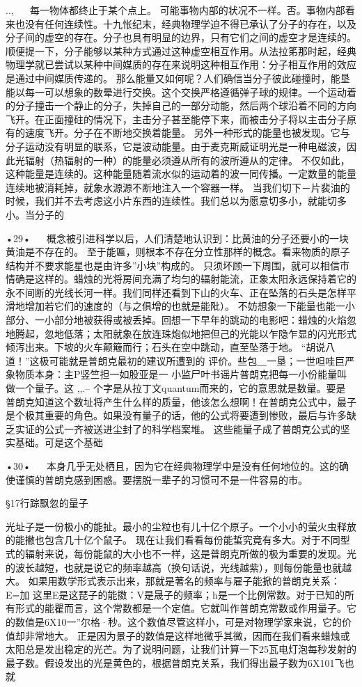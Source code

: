 ..,
  
每一物体都终止于某个点上。
可能事物内部的状况不一样。否。事物内部看来也没有任何连续性。十九怅纪末，经典物理学迫不得已承认了分子的存在，以及分子间的虚空的存在。分子也具有明显的边界，只有它们之间的虚空才是连续的。
顺便提一下，分子能够以某种方式通过这种虚空相互作用。从法拉笫那时起，经典物理学就已尝试以某种中间媒质的存在来说明这种相互作用：分子相互作用的效应是通过中间媒质传递的。
那么能量又如何呢？人们确信当分子彼此碰撞时，能垦能以每一可以想象的数晕进行交换。这个交换严格遵循弹子球的规律。一个运动着的分子撞击一个静止的分子，失掉自己的一部分动能，然后两个球沿着不同的方向飞开。在正面撞砫的情况下，主击分子甚至能停下来，而被击分子将以主击分子原有的速度飞开。分子在不断地交换着能量。
另外一种形式的能量也被发现。它与分子运动没有明显的联系，它是波动能量。由于麦克斯威证明光是一种电磁波，因此光辐射（热辐射的一种）的能量必须遵从所有的波所遵从的定律。
不仅如此，这种能量是连续的。这种能量随着流水似的运动着的波一同传播。一定数量的能量连续地被消耗掉，就象水源源不断地注入一个容器一样。
当我们切下－片裴油的时候，我们并不去考虑这小片东西的连续性。我们总以为愿意切多小，就能切多小。当分子的

•29•
  
概念被引进科学以后，人们清楚地认识到：比黄油的分子还要小的一块黄油是不存在的。
至于能匾，则根本不存在分立性那样的概念。看来物质的原子结构并不要求能星也是由许多”小块”构成的。
只须坏顾一下周围，就可以相信市情确是这样的。蜡烛的光将房间充满了均匀的辐射能流，正象太阳永远保持着它的永不间断的光线长河一样。我们同样还看到下山的火车、正在坠落的石头是怎样平滑地增加若它们的速度的（与之俱增的也就是能阰）。
不妨想象一下能量也能一小部分、一小部分地被获得或被丢掉。回想一下早年的跳动的电影吧：蜡烛的火焰忽地腾起，忽地低落；太阳就象在放连珠炮似地把但己的光能以乍隐乍显的闪光形式倾泻出来。下坡的火车颠簸而行；石头在空中跳动，直至坠落于地。
“胡说八道！”这极可能就是普朗克最初的建议所遭到的
评价。些包＿一垦；一世呾哇巨严象物质本身：主P竖竺担一如股亚是一
小监尸叶书谣片普朗克把每一小份能量叫做一个量子。这
,,.--
个字是从拉丁文quantum而来的，它的意思就是数量。要是
普朗克知道这个数址将产生什么样的质量，他该怎么想啊！在普朗克公式中，最子是个极其重要的角色。如果没有量子的话，他的公式将要遭到惨败，最后与许多缺乏实证的公式一齐被送进尘封了的科学档案堆。
这些能量子成了普朗克公式的坚实基础。可是这个基础

•30•
  
本身几乎无处栖且，因为它在经典物理学中是没有任何地位的。这的确使谨慎的普朗克感到困惑。要摆脱一辈子的习惯可不是一件容易的市。

§17行踪飘忽的量子

光址子是一份极小的能扯。最小的尘粒也有儿十亿个原子。一个小小的萤火虫释放的能撇也包含几十亿个鼠子。
现在让我们看看每份能蜇究竟有多大。对于不同型式的辐射来说，每份能鼠的大小也不一样，这是普朗克所做的极为重要的发现。光的波长越短，也就是说它的频率越高（换句话说，光线越紫），则每份能量也就越大。
如果用数学形式表示出来，那就是著名的频率与雇子能掀的普朗克关系：
E=加
这里E是这琵子的能擞：V是晟子的频率；h是一个比例常数。对于已知的所有形式的能瞿而言，这个常数都是一个定值。它就叫作普朗克常数或作用量子。它的数值是6X10一”尔格·秒。这个数值尽管这样小，可是对物理学家来说，它的价值却非常地大。
正是因为景子的数值是这样地微乎其微，因而在我们看来蜡烛或太阳总是发出稳定的光芒。为了说明问题，让我们计算一下25瓦电灯泡每秒发射的最子数。假设发出的光是黄色的，根据普朗克关系，我们得出最子数为6X101飞也就

